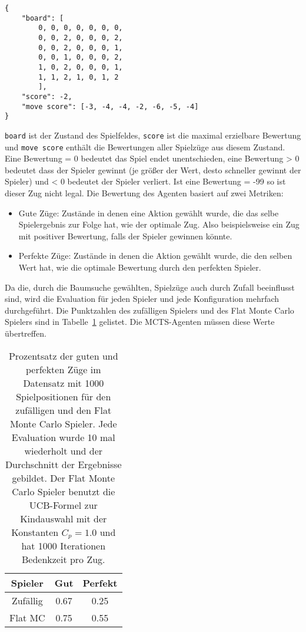 \begin{verbatim}
{
    "board": [
        0, 0, 0, 0, 0, 0, 0,
        0, 0, 2, 0, 0, 0, 2,
        0, 0, 2, 0, 0, 0, 1,
        0, 0, 1, 0, 0, 0, 2,
        1, 0, 2, 0, 0, 0, 1,
        1, 1, 2, 1, 0, 1, 2
        ],
    "score": -2,
    "move score": [-3, -4, -4, -2, -6, -5, -4]
}
\end{verbatim}

\verb|board| ist der Zustand des Spielfeldes, \verb|score| ist die maximal erzielbare Bewertung und \verb|move score| enthält die Bewertungen aller Spielzüge aus diesem Zustand.
Eine Bewertung = 0 bedeutet das Spiel endet unentschieden, eine Bewertung > 0 bedeutet dass der Spieler gewinnt (je größer der Wert, desto schneller gewinnt der Spieler) und < 0 bedeutet der Spieler verliert.
Ist eine Bewertung = -99 so ist dieser Zug nicht legal.
Die Bewertung des Agenten basiert auf zwei Metriken:
\begin{itemize}
    \item Gute Züge: Zustände in denen eine Aktion gewählt wurde, die das selbe Spielergebnis zur Folge hat, wie der optimale Zug. Also beispielsweise ein Zug mit positiver Bewertung, falls der Spieler gewinnen könnte.
    \item Perfekte Züge: Zustände in denen die Aktion gewählt wurde, die den selben Wert hat, wie die optimale Bewertung durch den perfekten Spieler.
\end{itemize}

Da die, durch die Baumsuche gewählten, Spielzüge auch durch Zufall beeinflusst sind, wird die Evaluation für jeden Spieler und jede Konfiguration mehrfach durchgeführt.
Die Punktzahlen des zufälligen Spielers und des Flat Monte Carlo Spielers sind in Tabelle~\ref{tab:move-evaluation-baseline} gelistet.
Die MCTS-Agenten müssen diese Werte übertreffen.

\begin{table}[h!]
\centering
\begin{tabular}{ |c||c|c| }
 \hline
 Spieler & Gut & Perfekt \\
 \hline
 Zufällig & 0.67 & 0.25 \\
 \hline
 Flat MC & 0.75 & 0.55 \\
 \hline
\end{tabular}
\caption{Prozentsatz der guten und perfekten Züge im Datensatz mit 1000 Spielpositionen für den zufälligen und den Flat Monte Carlo Spieler. Jede Evaluation wurde 10 mal wiederholt und der Durchschnitt der Ergebnisse gebildet. Der Flat Monte Carlo Spieler benutzt die UCB-Formel zur Kindauswahl mit der Konstanten $C_p=1.0$ und hat 1000 Iterationen Bedenkzeit pro Zug.}
\label{tab:move-evaluation-baseline}
\end{table}

